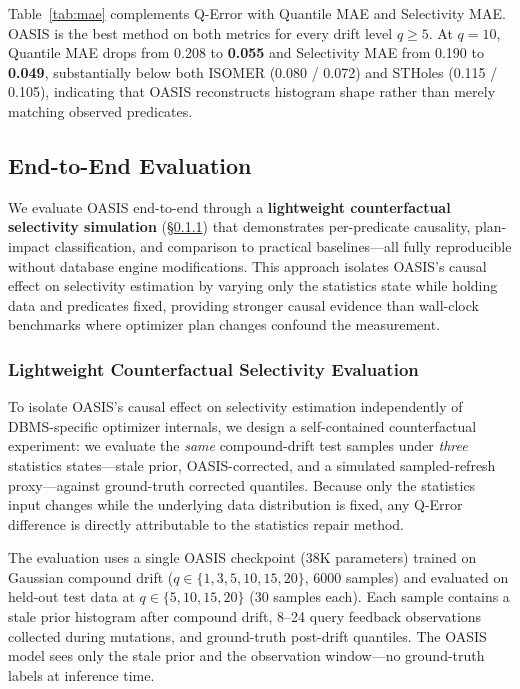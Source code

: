 \documentclass[runningheads]{llncs}
\begin{document}
Table~\ref{tab:mae} complements Q-Error with Quantile MAE and Selectivity MAE. OASIS is the best method on both metrics for every drift level $q{\geq}5$. At $q{=}10$, Quantile MAE drops from 0.208 to \textbf{0.055} and Selectivity MAE from 0.190 to \textbf{0.049}, substantially below both ISOMER (0.080 / 0.072) and STHoles (0.115 / 0.105), indicating that OASIS reconstructs histogram shape rather than merely matching observed predicates.


\subsection{End-to-End Evaluation}
\label{sec:tpcds}

We evaluate OASIS end-to-end through a \textbf{lightweight counterfactual selectivity simulation} (\S\ref{sec:lightweight_e2e}) that demonstrates per-predicate causality, plan-impact classification, and comparison to practical baselines---all fully reproducible without database engine modifications. This approach isolates OASIS's causal effect on selectivity estimation by varying only the statistics state while holding data and predicates fixed, providing stronger causal evidence than wall-clock benchmarks where optimizer plan changes confound the measurement.

\subsubsection{Lightweight Counterfactual Selectivity Evaluation}
\label{sec:lightweight_e2e}

To isolate OASIS's causal effect on selectivity estimation independently of DBMS-specific optimizer internals, we design a self-contained counterfactual experiment: we evaluate the \emph{same} compound-drift test samples under \emph{three} statistics states---stale prior, OASIS-corrected, and a simulated sampled-refresh proxy---against ground-truth corrected quantiles. Because only the statistics input changes while the underlying data distribution is fixed, any Q-Error difference is directly attributable to the statistics repair method.

The evaluation uses a single OASIS checkpoint (38K parameters) trained on Gaussian compound drift ($q{\in}\{1,3,5,10,15,20\}$, 6000 samples) and evaluated on held-out test data at $q{\in}\{5,10,15,20\}$ (30 samples each). Each sample contains a stale prior histogram after compound drift, 8--24 query feedback observations collected during mutations, and ground-truth post-drift quantiles. The OASIS model sees only the stale prior and the observation window---no ground-truth labels at inference time.
\end{document}
